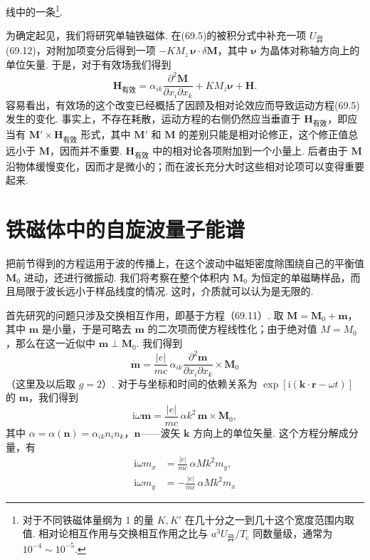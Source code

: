 线中的一条\footnote{对于不同铁磁体量纲为 1 的量 $K,K'$ 在几十分之一到几十这个宽度范围内取值. 相对论相互作用与交换相互作用之比与 $a^3U_{\text{异}}/T_{\mathrm{c}}$ 同数量级，通常为 $10^{-4}\sim10^{-5}$.}.

为确定起见，我们将研究单轴铁磁体. 在(69.5)的被积分式中补充一项 $U_{\text{异}}$ (69.12)，对附加项变分后得到一项 $-KM_z\,\bm{\nu}\cdot\delta\bm{M}$，其中 $\bm{\nu}$ 为晶体对称轴方向上的单位矢量. 于是，对于有效场我们得到
\begin{equation}
\bm{H}_{\text{有效}}=\alpha_{ik}\frac{\partial^2\bm{M}}{\partial x_i\partial x_k}
+KM_z\bm{\nu}+\bm{H}.
\end{equation}
容易看出，有效场的这个改变已经概括了因顾及相对论效应而导致运动方程(69.5)发生的变化. 事实上，不存在耗散，运动方程的右侧仍然应当垂直于 $\bm{H}_{\text{有效}}$，即应当有 $\bm{M}'\times\bm{H}_{\text{有效}}$ 形式，其中 $\bm{M}'$ 和 $\bm{M}$ 的差别只能是相对论修正，这个修正值总远小于 $\bm{M}$，因而并不重要. $\bm{H}_{\text{有效}}$ 中的相对论各项附加到一个小量上. 后者由于 $\bm{M}$ 沿物体缓慢变化，因而才是微小的；而在波长充分大时这些相对论项可以变得重要起来.

\section{铁磁体中的自旋波量子\quad 能谱}

把前节得到的方程运用于波的传播上，在这个波动中磁矩密度除围绕自己的平衡值 $\bm{M}_0$ 进动，还进行微振动. 我们将考察在整个体积内 $\bm{M}_0$ 为恒定的单磁畴样品，而且局限于波长远小于样品线度的情况. 这时，介质就可以认为是无限的.

首先研究的问题只涉及交换相互作用，即基于方程（69.11）. 取 $\bm{M}=\bm{M}_0+\bm{m}$，其中 $\bm{m}$ 是小量，于是可略去 $\bm{m}$ 的二次项而使方程线性化；由于绝对值 $M=M_0$，那么在这一近似中 $\bm{m}\perp\bm{M}_0$. 我们得到
\begin{equation}
\dot{\bm{m}}=\frac{|e|}{mc}\,\alpha_{ik}
\frac{\partial^2\bm{m}}{\partial x_i\partial x_k}\times\bm{M}_0
\end{equation}
（这里及以后取 $g=2$）. 对于与坐标和时间的依赖关系为 $\exp[\mathrm{i}(\bm{k}\cdot\bm{r}-\omega t)]$ 的 $\bm{m}$，我们得到
\begin{equation}
\mathrm{i}\omega\bm{m}=\frac{|e|}{mc}\,\alpha k^2\,\bm{m}\times\bm{M}_0,
\end{equation}
其中 $\alpha=\alpha(\bm{n})=\alpha_{ik}n_in_k$，$\bm{n}$——波矢 $\bm{k}$ 方向上的单位矢量. 这个方程分解成分量，有
\begin{equation*}
\begin{aligned}
\mathrm{i}\omega m_x&=\frac{|e|}{mc}\,\alpha Mk^2m_y,\\
\mathrm{i}\omega m_y&=-\frac{|e|}{mc}\,\alpha Mk^2m_x
\end{aligned}
\end{equation*}

